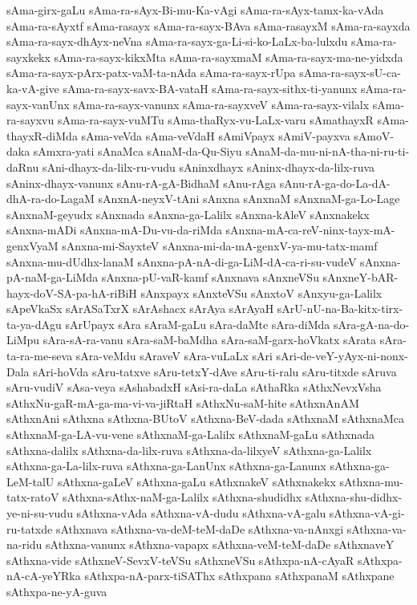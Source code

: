 {sAma-girx-gaLu
sAma-ra-sAyx-Bi-mu-Ka-vAgi
sAma-ra-sAyx-tamx-ka-vAda
sAma-ra-sAyxtf
sAma-rasayx
sAma-ra-sayx-BAva
sAma-rasayxM
sAma-ra-sayxda
sAma-ra-sayx-dhAyx-neVna
sAma-ra-sayx-ga-Li-si-ko-LaLx-ba-lulxdu
sAma-ra-sayxkekx
sAma-ra-sayx-kikxMta
sAma-ra-sayxmaM
sAma-ra-sayx-ma-ne-yidxda
sAma-ra-sayx-pArx-patx-vaM-ta-nAda
sAma-ra-sayx-rUpa
sAma-ra-sayx-sU-ca-ka-vA-give
sAma-ra-sayx-savx-BA-vataH
sAma-ra-sayx-sithx-ti-yanunx
sAma-ra-sayx-vanUnx
sAma-ra-sayx-vanunx
sAma-ra-sayxveV
sAma-ra-sayx-vilalx
sAma-ra-sayxvu
sAma-ra-sayx-vuMTu
sAma-thaRyx-vu-LaLx-varu
sAmathayxR
sAma-thayxR-diMda
sAma-veVda
sAma-veVdaH
sAmiVpayx
sAmiV-payxva
sAmoV-daka
sAmxra-yati
sAnaMca
sAnaM-da-Qu-Siyu
sAnaM-da-mu-ni-nA-tha-ni-ru-ti-daRnu
sAni-dhayx-da-lilx-ru-vudu
sAninxdhayx
sAninx-dhayx-da-lilx-ruva
sAninx-dhayx-vanunx
sAnu-rA-gA-BidhaM
sAnu-rAga
sAnu-rA-ga-do-La-dA-dhA-ra-do-LagaM
sAnxnA-neyxV-tAni
sAnxna
sAnxnaM
sAnxnaM-ga-Lo-Lage
sAnxnaM-geyudx
sAnxnada
sAnxna-ga-Lalilx
sAnxna-kAleV
sAnxnakekx
sAnxna-mADi
sAnxna-mA-Du-vu-da-riMda
sAnxna-mA-ca-reV-ninx-tayx-mA-genxVyaM
sAnxna-mi-SayxteV
sAnxna-mi-da-mA-genxV-ya-mu-tatx-mamf
sAnxna-mu-dUdhx-lanaM
sAnxna-pA-nA-di-ga-LiM-dA-ca-ri-su-vudeV
sAnxna-pA-naM-ga-LiMda
sAnxna-pU-vaR-kamf
sAnxnava
sAnxneVSu
sAnxneY-bAR-hayx-doV-SA-pa-hA-riBiH
sAnxpayx
sAnxteVSu
sAnxtoV
sAnxyu-ga-Lalilx
sApeVkaSx
sArASaTxrX
sArAshacx
sArAya
sArAyaH
sArU-nU-na-Ba-kitx-tirx-ta-ya-dAgu
sArUpayx
sAra
sAraM-gaLu
sAra-daMte
sAra-diMda
sAra-gA-na-do-LiMpu
sAra-sA-ra-vanu
sAra-saM-baMdha
sAra-saM-garx-hoVkatx
sArata
sAra-ta-ra-me-seva
sAra-veMdu
sAraveV
sAra-vuLaLx
sAri
sAri-de-veY-yAyx-ni-nonx-Dala
sAri-hoVda
sAru-tatxve
sAru-tetxY-dAve
sAru-ti-ralu
sAru-titxde
sAruva
sAru-vudiV
sAsa-veya
sAshabadxH
sAsi-ra-daLa
sAthaRka
sAthxNevxVsha
sAthxNu-gaR-mA-ga-ma-vi-va-jiRtaH
sAthxNu-saM-hite
sAthxnAnAM
sAthxnAni
sAthxna
sAthxna-BUtoV
sAthxna-BeV-dada
sAthxnaM
sAthxnaMca
sAthxnaM-ga-LA-vu-vene
sAthxnaM-ga-Lalilx
sAthxnaM-gaLu
sAthxnada
sAthxna-dalilx
sAthxna-da-lilx-ruva
sAthxna-da-lilxyeV
sAthxna-ga-Lalilx
sAthxna-ga-La-lilx-ruva
sAthxna-ga-LanUnx
sAthxna-ga-Lanunx
sAthxna-ga-LeM-talU
sAthxna-gaLeV
sAthxna-gaLu
sAthxnakeV
sAthxnakekx
sAthxna-mu-tatx-ratoV
sAthxna-sAthx-naM-ga-Lalilx
sAthxna-shudidhx
sAthxna-shu-didhx-ye-ni-su-vudu
sAthxna-vAda
sAthxna-vA-dudu
sAthxna-vA-galu
sAthxna-vA-gi-ru-tatxde
sAthxnava
sAthxna-va-deM-teM-daDe
sAthxna-va-nAnxgi
sAthxna-va-na-ridu
sAthxna-vanunx
sAthxna-vapapx
sAthxna-veM-teM-daDe
sAthxnaveY
sAthxna-vide
sAthxneV-SevxV-teVSu
sAthxneVSu
sAthxpa-nA-cAyaR
sAthxpa-nA-cA-yeYRka
sAthxpa-nA-parx-tiSAThx
sAthxpana
sAthxpanaM
sAthxpane
sAthxpa-ne-yA-guva
}
